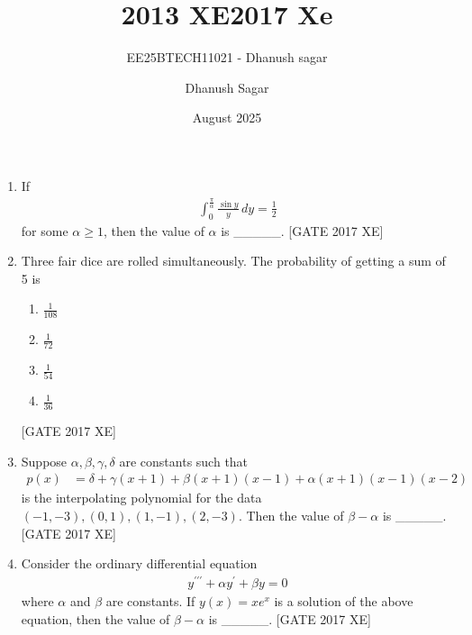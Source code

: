 \documentclass[journal,12pt,onecolumn]{IEEEtran}
\theoremstyle{remark}
\begin{document}
\title{2013 XE}
\author{EE25BTECH11021 - Dhanush sagar}
\maketitle
\renewcommand{\thefigure}{\theenumi}
\renewcommand{\thetable}{\theenumi}
\title{2017 Xe}
\author{Dhanush Sagar}
\date{August 2025}
\begin{enumerate}

 
    \item If
    \begin{align}
        \int_{0}^{\frac{\pi}{\alpha}} \frac{\sin y}{y}\, dy = \frac{1}{2}
    \end{align}
    for some $\alpha \geq 1$, then the value of $\alpha$ is \_\_\_\_\_.
    \hfill [GATE 2017 XE]

    \item Three fair dice are rolled simultaneously. The probability of getting a sum of 5 is
    \begin{multicols}{4}
    \begin{enumerate}
        \item $\tfrac{1}{108}$
        \item $\tfrac{1}{72}$
        \item $\tfrac{1}{54}$
        \item $\tfrac{1}{36}$
    \end{enumerate}
    \end{multicols}
    \hfill [GATE 2017 XE]

    \item Suppose $\alpha, \beta, \gamma, \delta$ are constants such that
    \begin{align}
        p(x) &= \delta + \gamma(x+1) + \beta(x+1)(x-1) + \alpha(x+1)(x-1)(x-2)
    \end{align}
    is the interpolating polynomial for the data $(-1,-3), (0,1), (1,-1), (2,-3)$.  
    Then the value of $\beta - \alpha$ is \_\_\_\_\_.
    \hfill [GATE 2017 XE]

    \item Consider the ordinary differential equation
    \begin{align}
        y^{\prime\prime\prime} + \alpha y^{\prime} + \beta y = 0
    \end{align}
    where $\alpha$ and $\beta$ are constants. If $y(x) = x e^x$ is a solution of the above equation,  
    then the value of $\beta - \alpha$ is \_\_\_\_\_.
    \hfill [GATE 2017 XE]


\end{enumerate}
\end{document}
